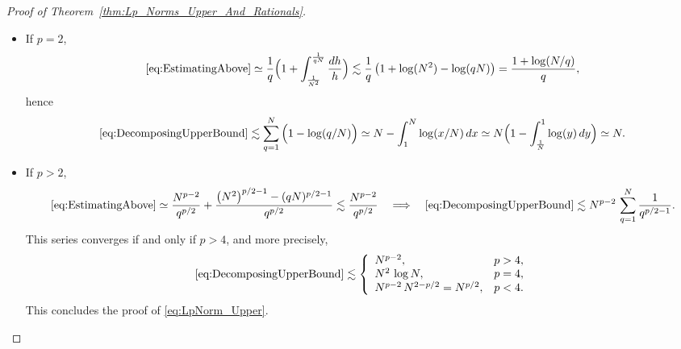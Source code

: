 \documentclass[11pt,reqno]{amsart}
\theoremstyle{definition}
\begin{document}
\begin{proof}[Proof of Theorem~\ref{thm:Lp_Norms_Upper_And_Rationals}]
\begin{itemize}
	\item If $p=2$, 
	\begin{equation}
	\eqref{eq:EstimatingAbove} 
	\simeq  \frac{1}{q} \Big( 1 +  \int_{\frac{1}{N^2}}^{\frac{1}{qN}}  \frac{dh}{h} \Big) \lesssim \frac{1}{q} \left( 1 + \log(N^2) - \log(qN) \right)
	= \frac{1 +  \log (N/q) }{q}, 
	\end{equation}
	hence 
	\begin{equation}
	\eqref{eq:DecomposingUpperBound} 
	\lesssim \sum_{q=1}^N \Big( 1 -  \log ( q/N )  \Big) \simeq N - \int_1^N \log(x/N) \, dx \simeq N \Big( 1  -\int_{\frac{1}{N}}^1 \log(y)\, dy  \Big)
	\simeq N. 
	\end{equation}
	
	\item If $p > 2$, 
	\begin{equation}
	\eqref{eq:EstimatingAbove} 
	\simeq  \frac{N^{p-2}}{q^{p/2}} + \frac{ \left( N^2 \right)^{p/2 - 1} -  (qN )^{p/2 - 1} }{q^{p/2}} 
	\lesssim \frac{N^{p-2}}{q^{p/2}} 
	\quad \Longrightarrow \quad 
	\eqref{eq:DecomposingUpperBound} \lesssim N^{p-2} \, \sum_{q=1}^N \frac{1}{q^{p/2 - 1}}.  
	\end{equation}
	This series converges if and only if $p > 4$, and more precisely, 
	\begin{equation}
	\eqref{eq:DecomposingUpperBound} \lesssim 
	\left\{  \begin{array}{ll}
	N^{p-2}, & p > 4, \\
	N^2 \, \log N, & p = 4, \\
	N^{p-2} \, N^{2 - p/2} = N^{p/2}, &  p < 4. 
	\end{array}\right.
	\end{equation}
	This concludes the proof of \eqref{eq:LpNorm_Upper}. 
\end{itemize}


\end{proof}
\end{document}
